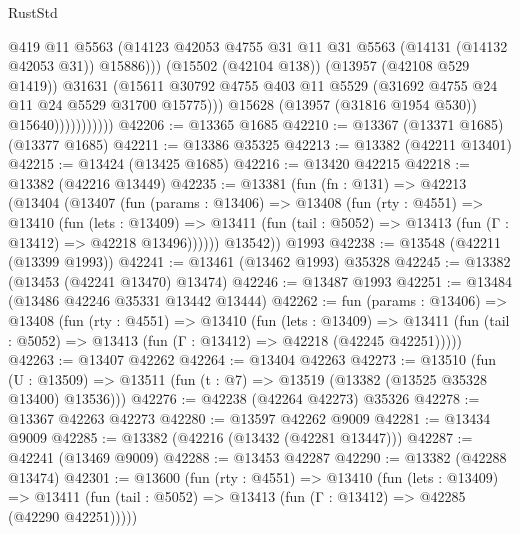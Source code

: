 \begin{lexlean}{RustStd}
\begin{coremodule}
                                @419
                                @11
                                @5563
                                (@14123
                                  @42053
                                  @4755
                                  @31
                                  @11
                                  @31
                                  @5563
                                  (@14131 (@14132 @42053 @31))
                                  @15886)))
                            (@15502 (@42104 @138))
                            (@13957 (@42108 @529 @1419))
                            @31631
                            (@15611
                              @30792
                              @4755
                              @403
                              @11
                              @5529
                              (@31692 @4755 @24 @11 @24 @5529 @31700 @15775)))
                          @15628
                          (@13957 (@31816 @1954 @530))
                          @15640)))))))))))
@42206 := @13365 @1685
@42210 := @13367 (@13371 @1685) (@13377 @1685)
@42211 := @13386 @35325
@42213 := @13382 (@42211 @13401)
@42215 := @13424 (@13425 @1685)
@42216 := @13420 @42215
@42218 := @13382 (@42216 @13449)
@42235 := @13381
    (fun (fn : @131) =>
    @42213
      (@13404
        (@13407
          (fun (params : @13406) =>
          @13408
            (fun (rty : @4551) =>
            @13410
              (fun (lets : @13409) =>
              @13411 (fun (tail : @5052) => @13413 (fun (Γ : @13412) => @42218 @13496))))))
        @13542))
    @1993
@42238 := @13548 (@42211 (@13399 @1993))
@42241 := @13461 (@13462 @1993) @35328
@42245 := @13382 (@13453 (@42241 @13470) @13474)
@42246 := @13487 @1993
@42251 := @13484 (@13486 @42246 @35331 @13442 @13444)
@42262 := fun (params : @13406) =>
  @13408
    (fun (rty : @4551) =>
    @13410
      (fun (lets : @13409) =>
      @13411 (fun (tail : @5052) => @13413 (fun (Γ : @13412) => @42218 (@42245 @42251)))))
@42263 := @13407 @42262
@42264 := @13404 @42263
@42273 := @13510
    (fun (U : @13509) => @13511 (fun (t : @7) => @13519 (@13382 (@13525 @35328 @13400) @13536)))
@42276 := @42238 (@42264 @42273) @35326
@42278 := @13367 @42263 @42273
@42280 := @13597 @42262 @9009
@42281 := @13434 @9009
@42285 := @13382 (@42216 (@13432 (@42281 @13447)))
@42287 := @42241 (@13469 @9009)
@42288 := @13453 @42287
@42290 := @13382 (@42288 @13474)
@42301 := @13600
    (fun (rty : @4551) =>
    @13410
      (fun (lets : @13409) =>
      @13411 (fun (tail : @5052) => @13413 (fun (Γ : @13412) => @42285 (@42290 @42251)))))

\end{coremodule}
\end{lexlean}
